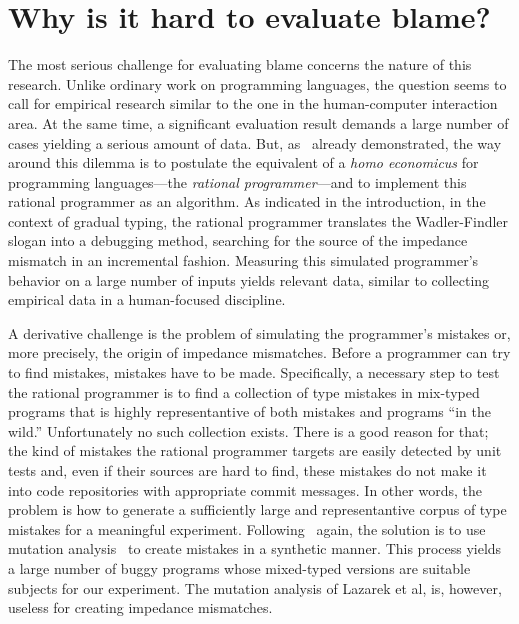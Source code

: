 
\section{Why is it hard to evaluate blame?}
\label{sec:challenges}

The most serious challenge for evaluating blame concerns 
the nature of this research. Unlike ordinary
work on programming languages, the question seems to call for empirical research
similar to the one in the human-computer interaction area. At the same time, a
significant evaluation result demands a large number of cases yielding a serious
amount of data. But, as~\citet{lksfd-popl-2020} already demonstrated, the way
around this dilemma is to postulate the equivalent of a {\it homo economicus\/}
for programming languages---the {\em rational programmer\/}---and to implement
this rational programmer as an algorithm.  As indicated in the introduction, in
the context of gradual typing, the rational programmer translates the
Wadler-Findler slogan into a debugging method, searching for the source of the
impedance mismatch in an incremental fashion. Measuring this simulated
programmer's behavior on a large number of inputs yields relevant 
data, similar to collecting empirical data in a human-focused discipline. 

A derivative challenge is the problem of simulating the programmer's
mistakes or, more precisely, the origin of impedance mismatches. Before a
programmer can try to find mistakes, mistakes have to be made.
Specifically, a necessary step to test the rational programmer is to find
a collection of  type mistakes in  mix-typed programs that is highly
representantive of both mistakes and programs ``in the wild.''
Unfortunately no such collection exists.  There is a good reason for that;
the kind of mistakes the rational programmer targets are easily detected
by unit tests and, even if their sources are hard to find, these mistakes do not make it
into code repositories with appropriate commit messages.  In other words, the problem is how to generate a
sufficiently large and representantive corpus of type mistakes for a meaningful
experiment.  Following~\citet{lksfd-popl-2020} again, the solution is to
use mutation analysis~\cite{lipton1971fault, demillo1978hints,
jia2011analysis} to create mistakes in a synthetic manner. This process
yields a large number of buggy programs whose mixed-typed versions are
suitable subjects for our experiment.  The mutation analysis of Lazarek et
al, is, however, useless for creating impedance mismatches.

